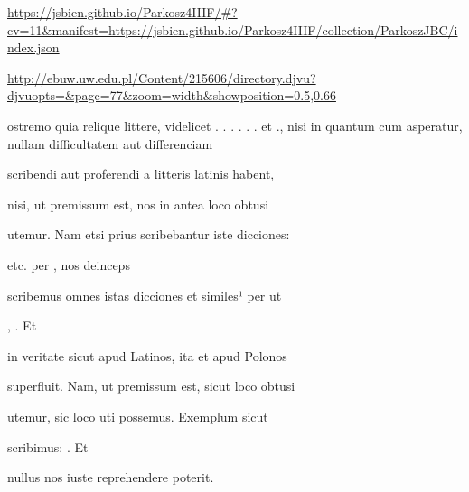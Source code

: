 
\newParkoszpage

{
  \url{https://jsbien.github.io/Parkosz4IIIF/\#?cv=11&manifest=https://jsbien.github.io/Parkosz4IIIF/collection/ParkoszJBC/index.json}

\url{http://ebuw.uw.edu.pl/Content/215606/directory.djvu?djvuopts=&page=77&zoom=width&showposition=0.5,0.66}
}

\bigskip

\obeylines
\mono



\fullpreviouslines


{
\color{blue}

\indentP {}ostremo quia relique littere, videlicet
 . . . . .  .  et ., nisi in quantum cum
 asperatur, nullam difficultatem aut  differenciam

scribendi aut proferendi a litteris latinis habent,
}


\fulllines

nisi, ut premissum est, nos in antea  loco  obtusi

utemur. Nam etsi prius scribebantur iste dicciones:  

    etc. per , nos deinceps

scribemus omnes istas dicciones et similes¹ per  ut 

 ,    . Et

in veritate  sicut apud Latinos, ita et apud Polonos

superfluit. Nam, ut premissum est, sicut loco  obtusi

 utemur, sic loco   uti possemus. Exemplum sicut

scribimus:     . Et

nullus nos iuste reprehendere poterit.

